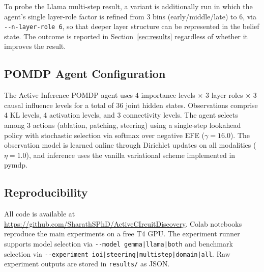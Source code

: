 To probe the Llama multi-step result, a
variant is additionally run in which the agent's single layer-role factor is
refined from 3 bins (early/middle/late) to 6, via \texttt{-{}-n-layer-role 6}, so
that deeper layer structure can be represented in the belief state. The outcome is
reported in Section~\ref{sec:results} regardless of whether it improves the result.

\subsection{POMDP Agent Configuration}

The Active Inference POMDP agent uses 4 importance levels $\times$
3 layer roles $\times$ 3 causal influence levels for a total of 36
joint hidden states.  Observations comprise 4 KL levels, 4 activation
levels, and 3 connectivity levels.  The agent selects among 3 actions
(ablation, patching, steering) using a single-step lookahead policy
with stochastic selection via softmax over negative EFE
($\gamma = 16.0$).  The observation model is learned online through
Dirichlet updates on all modalities ($\eta = 1.0$), and inference
uses the vanilla variational scheme implemented in pymdp.

\subsection{Reproducibility}

All code is available at
\url{https://github.com/SharathSPhD/ActiveCIrcuitDiscovery}.
Colab notebooks reproduce the main experiments on a free T4 GPU.
The experiment runner supports model selection via
\texttt{-{}-model gemma|llama|both} and benchmark selection via
\texttt{-{}-experiment ioi|steering|multistep|domain|all}.
Raw experiment outputs are stored in \texttt{results/} as JSON.

